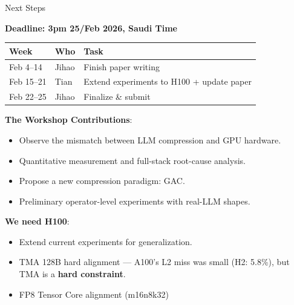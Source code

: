 \documentclass[aspectratio=169,10pt]{beamer}
\begin{document}
\begin{frame}{Next Steps}

\textbf{Deadline: 3pm 25/Feb 2026, Saudi Time}

\vspace{0.3cm}
\begin{tabular}{@{}lll@{}}
\toprule
\textbf{Week} & \textbf{Who} & \textbf{Task} \\
\midrule
Feb 4--14 & Jihao & Finish paper writing \\
Feb 15--21 & Tian & Extend experiments to H100 + update paper \\
Feb 22--25 & Jihao & Finalize \& submit \\
\bottomrule
\end{tabular}
\vspace{0.3cm}

\textbf{The Workshop Contributions}:
\begin{itemize}\setlength\itemsep{0.1em}
\item Observe the mismatch between LLM compression and GPU hardware.
\item Quantitative measurement and full-stack root-cause analysis.
\item Propose a new compression paradigm: GAC.
\item Preliminary operator-level experiments with real-LLM shapes.
\end{itemize}
\vspace{0.3cm}
\textbf{We need H100}:
\begin{itemize}\setlength\itemsep{0.1em}
\item Extend current experiments for generalization.
\item TMA 128B hard alignment --- A100's L2 miss was small (H2: 5.8\%), but TMA is a \textbf{hard constraint}.
\item FP8 Tensor Core alignment (m16n8k32)
\end{itemize}
\end{frame}
\end{document}
